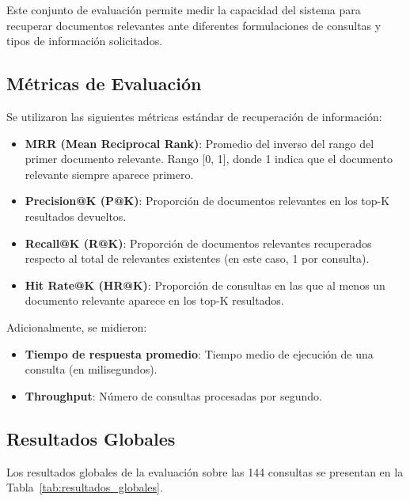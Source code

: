 Este conjunto de evaluación permite medir la capacidad del sistema para recuperar documentos relevantes ante diferentes formulaciones de consultas y tipos de información solicitados.

\subsection{Métricas de Evaluación}

Se utilizaron las siguientes métricas estándar de recuperación de información:

\begin{itemize}
    \item \textbf{MRR (Mean Reciprocal Rank)}: Promedio del inverso del rango del primer documento relevante. Rango [0, 1], donde 1 indica que el documento relevante siempre aparece primero.
    \item \textbf{Precision@K (P@K)}: Proporción de documentos relevantes en los top-K resultados devueltos.
    \item \textbf{Recall@K (R@K)}: Proporción de documentos relevantes recuperados respecto al total de relevantes existentes (en este caso, 1 por consulta).
    \item \textbf{Hit Rate@K (HR@K)}: Proporción de consultas en las que al menos un documento relevante aparece en los top-K resultados.
\end{itemize}

Adicionalmente, se midieron:
\begin{itemize}
    \item \textbf{Tiempo de respuesta promedio}: Tiempo medio de ejecución de una consulta (en milisegundos).
    \item \textbf{Throughput}: Número de consultas procesadas por segundo.
\end{itemize}

\subsection{Resultados Globales}

Los resultados globales de la evaluación sobre las 144 consultas se presentan en la Tabla~\ref{tab:resultados_globales}.

